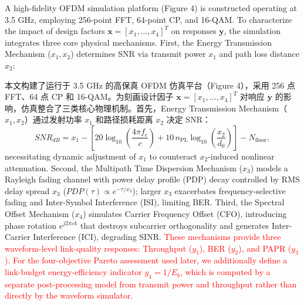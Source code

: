 \documentclass[11pt]{article}
\begin{document}
A high-fidelity OFDM simulation platform (Figure 4) is constructed operating at 3.5 GHz, employing 256-point FFT, 64-point CP, and 16-QAM. To characterize the impact of design factors $\mathbf{x}={{[{{x}_{1}},\ldots ,{{x}_{4}}]}^{T}}$ on responses $\mathbf{y}$, the simulation integrates three core physical mechanisms. First, the Energy Transmission Mechanism (${{x}_{1}},{{x}_{2}}$) determines SNR via transmit power ${{x}_{1}}$ and path loss distance ${{x}_{2}}$:

本文构建了运行于 3.5 GHz 的高保真 OFDM 仿真平台（Figure 4），采用 256 点 FFT、64 点 CP 和 16-QAM。为刻画设计因子 $\mathbf{x}={{[{{x}_{1}},\ldots ,{{x}_{4}}]}^{T}}$ 对响应 $\mathbf{y}$ 的影响，仿真整合了三类核心物理机制。首先，Energy Transmission Mechanism（${{x}_{1}},{{x}_{2}}$）通过发射功率 ${{x}_{1}}$ 和路径损耗距离 ${{x}_{2}}$ 决定 SNR：
\begin{equation}
	SN{R_{dB}} = {x_1} - \left[ 20\log_{10}\!\left( \frac{4\pi {f_c}}{c} \right) + 10\,n_{\mathrm{PL}}\log_{10}\!\left( \frac{{{x_2}}}{{{d_0}}} \right) \right] - N_{\mathrm{floor}},
\end{equation}
necessitating dynamic adjustment of ${{x}_{1}}$ to counteract ${{x}_{2}}$-induced nonlinear attenuation. Second, the Multipath Time Dispersion Mechanism (${{x}_{3}}$) models a Rayleigh fading channel with power delay profile (PDP) decay controlled by RMS delay spread ${{x}_{3}}$ ($PDP(\tau )\propto {{e}^{-\tau /{{x}_{3}}}}$); larger ${{x}_{3}}$ exacerbates frequency-selective fading and Inter-Symbol Interference (ISI), limiting BER. Third, the Spectral Offset Mechanism (${{x}_{4}}$) simulates Carrier Frequency Offset (CFO), introducing phase rotation ${{e}^{j2\pi \varepsilon k}}$ that destroys subcarrier orthogonality and generates Inter-Carrier Interference (ICI), degrading SINR. \textcolor{red}{These mechanisms provide three waveform-level link-quality responses: Throughput (${{y}_{1}}$), BER (${{y}_{2}}$), and PAPR (${{y}_{3}}$). For the four-objective Pareto assessment used later, we additionally define a link-budget energy-efficiency indicator ${{y}_{4}}=1/{{E}_{b}}$, which is computed by a separate post-processing model from transmit power and throughput rather than directly by the waveform simulator.}%
\end{document}
